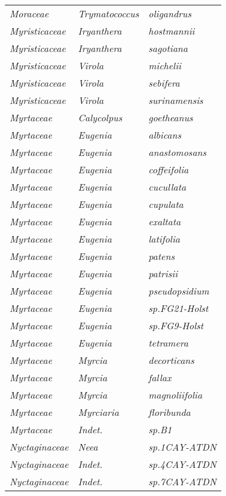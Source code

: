 \documentclass[fleqn,10pt]{ArtEcoFoG} %
\renewenvironment{table}{\begin{table*}}{\end{table*}\ignorespacesafterend}
\begin{document}
\begin{table}
\begin{tabular}[t]{lll}
\em{Moraceae} & \em{Trymatococcus} & \em{oligandrus}\\
\addlinespace
\em{Myristicaceae} & \em{Iryanthera} & \em{hostmannii}\\
\em{Myristicaceae} & \em{Iryanthera} & \em{sagotiana}\\
\em{Myristicaceae} & \em{Virola} & \em{michelii}\\
\em{Myristicaceae} & \em{Virola} & \em{sebifera}\\
\em{Myristicaceae} & \em{Virola} & \em{surinamensis}\\
\addlinespace
\em{Myrtaceae} & \em{Calycolpus} & \em{goetheanus}\\
\em{Myrtaceae} & \em{Eugenia} & \em{albicans}\\
\em{Myrtaceae} & \em{Eugenia} & \em{anastomosans}\\
\em{Myrtaceae} & \em{Eugenia} & \em{coffeifolia}\\
\em{Myrtaceae} & \em{Eugenia} & \em{cucullata}\\
\addlinespace
\em{Myrtaceae} & \em{Eugenia} & \em{cupulata}\\
\em{Myrtaceae} & \em{Eugenia} & \em{exaltata}\\
\em{Myrtaceae} & \em{Eugenia} & \em{latifolia}\\
\em{Myrtaceae} & \em{Eugenia} & \em{patens}\\
\em{Myrtaceae} & \em{Eugenia} & \em{patrisii}\\
\addlinespace
\em{Myrtaceae} & \em{Eugenia} & \em{pseudopsidium}\\
\em{Myrtaceae} & \em{Eugenia} & \em{sp.FG21-Holst}\\
\em{Myrtaceae} & \em{Eugenia} & \em{sp.FG9-Holst}\\
\em{Myrtaceae} & \em{Eugenia} & \em{tetramera}\\
\em{Myrtaceae} & \em{Myrcia} & \em{decorticans}\\
\addlinespace
\em{Myrtaceae} & \em{Myrcia} & \em{fallax}\\
\em{Myrtaceae} & \em{Myrcia} & \em{magnoliifolia}\\
\em{Myrtaceae} & \em{Myrciaria} & \em{floribunda}\\
\em{Myrtaceae} & \em{Indet.} & \em{sp.B1}\\
\em{Nyctaginaceae} & \em{Neea} & \em{sp.1CAY-ATDN}\\
\addlinespace
\em{Nyctaginaceae} & \em{Indet.} & \em{sp.4CAY-ATDN}\\
\em{Nyctaginaceae} & \em{Indet.} & \em{sp.7CAY-ATDN}\\

\end{tabular}
\end{table}
\end{document}
